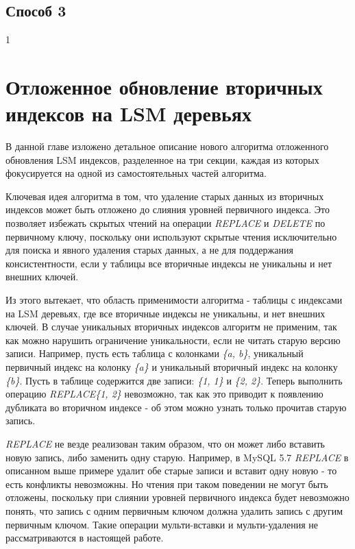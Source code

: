 \documentclass[a4paper,hidelinks,12pt]{article}
\begin{document}
\subsection{Способ 3}
1

\section{Отложенное обновление вторичных индексов на LSM деревьях}
В данной главе изложено детальное описание нового алгоритма отложенного
обновления LSM индексов, разделенное на три секции, каждая из которых
фокусируется на одной из самостоятельных частей алгоритма.

Ключевая идея алгоритма в том, что удаление старых данных из вторичных индексов
может быть отложено до слияния уровней первичного индекса. Это позволяет
избежать скрытых чтений на операции \textit{REPLACE} и \textit{DELETE} по
первичному ключу, поскольку они используют скрытые чтения исключительно для
поиска и явного удаления старых данных, а не для поддержания консистентности,
если у таблицы все вторичные индексы не уникальны и нет внешних ключей.

Из этого вытекает, что область применимости алгоритма - таблицы с индексами на
LSM деревьях, где все вторичные индексы не уникальны, и нет внешних ключей. В
случае уникальных вторичных индексов алгоритм не применим, так как можно
нарушить ограничение уникальности, если не читать старую версию записи.
Например, пусть есть таблица с колонками \textit{\{a, b\}}, уникальный первичный
индекс на колонку \textit{\{a\}} и уникальный вторичный индекс на колонку
\textit{\{b\}}. Пусть в таблице содержится две записи: \textit{\{1, 1\}} и
\textit{\{2, 2\}}. Теперь выполнить операцию \textit{REPLACE\{1, 2\}} невозможно,
так как это приводит к появлению дубликата во вторичном индексе - об этом можно
узнать только прочитав старую запись.

\textit{REPLACE} не везде реализован таким образом, что он может либо вставить
новую запись, либо заменить одну старую. Например, в MySQL 5.7 \textit{REPLACE}
в описанном выше примере удалит обе старые записи и вставит одну новую - то есть
конфликты невозможны. Но чтения при таком поведении не могут быть отложены,
поскольку при слиянии уровней первичного индекса будет невозможно понять, что
запись с одним первичным ключом должна удалить запись с другим первичным ключом.
Такие операции мульти-вставки и мульти-удаления не рассматриваются в настоящей
работе.
\end{document}
